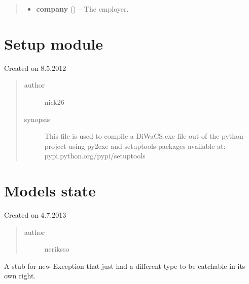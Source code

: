 \documentclass[letterpaper,10pt,english]{sphinxmanual}
\begin{document}
\begin{fulllineitems}
\begin{quote}
\begin{description}
\begin{itemize}
\item {} 
\textbf{company} ({\hyperref[models:models.Company]{}}) -- The employer.

\end{itemize}

\end{description}\end{quote}

\end{fulllineitems}



\section{Setup module}
\label{setup:setup-module}\label{setup::doc}
Created on 8.5.2012
\begin{quote}\begin{description}
\item[{author}] \leavevmode
nick26

\item[{synopsis}] \leavevmode
This file is used to compile a DiWaCS.exe file out of the python project
using py2exe and setuptools packages available at:
pypi.python.org/pypi/setuptools

\end{description}\end{quote}


\section{Models state}
\label{state:module-state}\label{state::doc}\label{state:models-state}
Created on 4.7.2013
\begin{quote}\begin{description}
\item[{author}] \leavevmode
neriksso

\end{description}\end{quote}

\begin{fulllineitems}
\label{state:state.SessionChangeException}
A stub for new Exception that just had a different type to be
catchable in its own right.

\end{fulllineitems}
\end{document}
